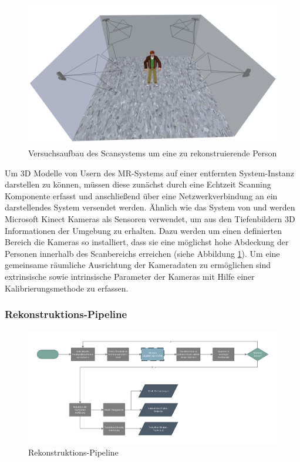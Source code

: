 \begin{figure}[H]
	\centering
	\includegraphics[width=.7\textwidth]{figs/scanning_setup}
	\caption{Versuchsaufbau des Scansystems um eine zu rekonstruierende Person}
	\label{fig:recon_setup}
\end{figure}

Um 3D Modelle von Usern des MR-Systems auf einer entfernten System-Instanz 
darstellen zu können, müssen diese zunächst durch eine Echtzeit Scanning 
Komponente erfasst und anschließend über eine Netzwerkverbindung an ein 
darstellendes System versendet werden. Ähnlich wie das System von 
\cite{alexiadis2013real} und \cite{mekuria2013teleimmersion} werden Microsoft 
Kinect Kameras als Sensoren verwendet, um aus den Tiefenbildern 3D Informationen 
der Umgebung zu erhalten. Dazu werden um einen definierten Bereich die Kameras 
so installiert, dass sie eine möglichst hohe Abdeckung der Personen innerhalb 
des Scanbereichs erreichen (siehe Abbildung \ref{fig:recon_setup}). Um eine 
gemeinsame räumliche Ausrichtung der Kameradaten zu ermöglichen sind 
extrinsische sowie intrinsische Parameter der Kameras mit Hilfe einer 
Kalibrierungsmethode zu erfassen.

\subsubsection{Rekonstruktions-Pipeline}


\begin{figure}[H]
	\centering
	\includegraphics[width=\textwidth]{figs/recon_pipeline}
	\caption{Rekonstruktions-Pipeline}
	\label{fig:recon_pipeline}
\end{figure}

